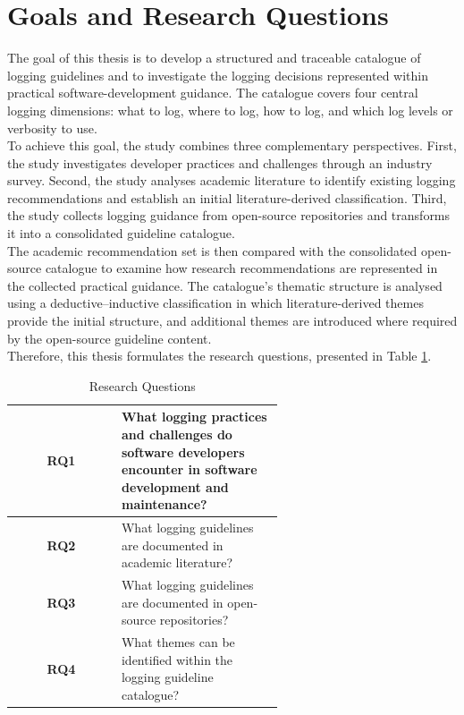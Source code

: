 \section{Goals and Research Questions}

The goal of this thesis is to develop a structured and traceable catalogue of
logging guidelines and to investigate the logging decisions represented within
practical software-development guidance. The catalogue covers four central logging
dimensions: what to log, where to log, how to log, and which log levels or verbosity
to use.
\\
To achieve this goal, the study combines three complementary perspectives. First,
the study investigates developer practices and challenges through an industry survey.
Second, the study analyses academic literature to identify existing logging recommendations
and establish an initial literature-derived classification. Third, 
the study collects logging guidance from open-source repositories and transforms it into a
consolidated guideline catalogue.
\\
The academic recommendation set is then compared with the consolidated
open-source catalogue to examine how research recommendations are
represented in the collected practical guidance. The catalogue's thematic structure
is analysed using a deductive--inductive classification in which
literature-derived themes provide the initial structure, and additional themes are
introduced where required by the open-source guideline content.
\\
Therefore, this thesis formulates the research questions, presented in Table \ref{table:t1rq}.
\begin{table}[H]
\centering
\begin{tabular}{|c | p{0.6\linewidth}|}
 \hline
 \textbf{RQ1} & What logging practices and challenges do software developers encounter in software development and maintenance? \\
 \hline
 \textbf{RQ2} & What logging guidelines are documented in academic literature? \\
 \hline
 \textbf{RQ3} & What logging guidelines are documented in open-source repositories? \\
 \hline
 \textbf{RQ4} & What themes can be identified within the logging guideline catalogue? \\
 \hline
\end{tabular}
\caption{Research Questions}
\label{table:t1rq}
\end{table}


